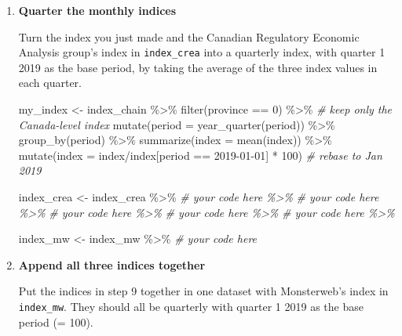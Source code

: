 \documentclass[
]{article}
\newenvironment{Shaded}{\begin{snugshade}}{\end{snugshade}}
\newcommand{\AttributeTok}[1]{\textcolor[rgb]{0.77,0.63,0.00}{#1}}
\newcommand{\CommentTok}[1]{\textcolor[rgb]{0.56,0.35,0.01}{\textit{#1}}}
\newcommand{\DecValTok}[1]{\textcolor[rgb]{0.00,0.00,0.81}{#1}}
\newcommand{\FunctionTok}[1]{\textcolor[rgb]{0.00,0.00,0.00}{#1}}
\newcommand{\NormalTok}[1]{#1}
\newcommand{\OtherTok}[1]{\textcolor[rgb]{0.56,0.35,0.01}{#1}}
\newcommand{\SpecialCharTok}[1]{\textcolor[rgb]{0.00,0.00,0.00}{#1}}
\newcommand{\StringTok}[1]{\textcolor[rgb]{0.31,0.60,0.02}{#1}}
\begin{document}
\begin{enumerate}
\def\labelenumi{\arabic{enumi}.}
\setcounter{enumi}{8}
\item
  \textbf{Quarter the monthly indices}

  Turn the index you just made and the Canadian Regulatory Economic Analysis group's index in \texttt{index\_crea} into a quarterly index, with quarter 1 2019 as the base period, by taking the average of the three index values in each quarter.

\begin{Shaded}
\begin{Highlighting}[]
\NormalTok{my\_index }\OtherTok{\textless{}{-}}\NormalTok{ index\_chain }\SpecialCharTok{\%\textgreater{}\%}
  \FunctionTok{filter}\NormalTok{(province }\SpecialCharTok{==} \StringTok{\textquotesingle{}0\textquotesingle{}}\NormalTok{) }\SpecialCharTok{\%\textgreater{}\%} \CommentTok{\# keep only the Canada{-}level index}
  \FunctionTok{mutate}\NormalTok{(}\AttributeTok{period =} \FunctionTok{year\_quarter}\NormalTok{(period)) }\SpecialCharTok{\%\textgreater{}\%}
  \FunctionTok{group\_by}\NormalTok{(period) }\SpecialCharTok{\%\textgreater{}\%}
  \FunctionTok{summarize}\NormalTok{(}\AttributeTok{index =} \FunctionTok{mean}\NormalTok{(index)) }\SpecialCharTok{\%\textgreater{}\%}
  \FunctionTok{mutate}\NormalTok{(}\AttributeTok{index =}\NormalTok{ index}\SpecialCharTok{/}\NormalTok{index[period }\SpecialCharTok{==} \StringTok{\textquotesingle{}2019{-}01{-}01\textquotesingle{}}\NormalTok{] }\SpecialCharTok{*} \DecValTok{100}\NormalTok{) }\CommentTok{\# rebase to Jan 2019}

\NormalTok{index\_crea }\OtherTok{\textless{}{-}}\NormalTok{ index\_crea }\SpecialCharTok{\%\textgreater{}\%}
  \CommentTok{\# your code here \%\textgreater{}\%}
  \CommentTok{\# your code here \%\textgreater{}\%}
  \CommentTok{\# your code here \%\textgreater{}\%}
  \CommentTok{\# your code here \%\textgreater{}\%}
  \CommentTok{\# your code here \%\textgreater{}\%}

\NormalTok{index\_mw }\OtherTok{\textless{}{-}}\NormalTok{ index\_mw }\SpecialCharTok{\%\textgreater{}\%}
  \CommentTok{\# your code here}
\end{Highlighting}
\end{Shaded}
\item
  \textbf{Append all three indices together}

  Put the indices in step 9 together in one dataset with Monsterweb's index in \texttt{index\_mw}. They should all be quarterly with quarter 1 2019 as the base period (= 100).
\end{enumerate}
\end{document}
